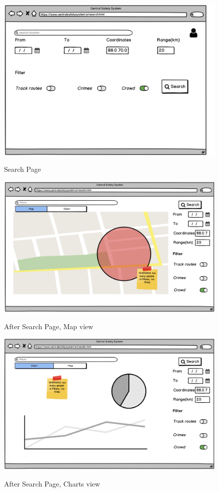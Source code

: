 \documentclass[../main.tex]{subfiles}
\begin{document}
    \begin{figure}[H]
        \centering
        \includegraphics[scale = 0.33]{assets/wireframes/wire2.png} \\
        \caption[]{Search Page}\label{fig:figure7}
    \end{figure}
    \begin{figure}[H]
        \centering
        \includegraphics[scale = 0.33]{assets/wireframes/wire3.png} \\
        \caption[]{After Search Page, Map view}\label{fig:figure8}
    \end{figure}
    \begin{figure}[H]
        \centering
        \includegraphics[scale = 0.33]{assets/wireframes/wire4.png} \\
        \caption[]{After Search Page, Charts view}\label{fig:figure9}
    \end{figure}
\end{document}
